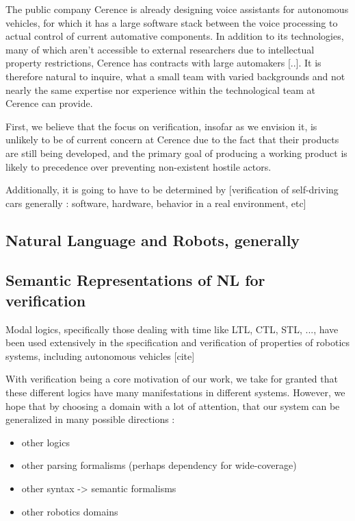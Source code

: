 \documentclass[a4paper, 11pt]{article}
\begin{document}
The public company Cerence \cite{} is already designing voice assistants for autonomous
vehicles, for which it has a large software stack between the voice processing
to actual control of current automative components. In addition to its 
technologies, many of which aren't accessible to external researchers due to
intellectual property restrictions, Cerence has contracts with large automakers
[..]. It is therefore natural to inquire, what a small team with varied
backgrounds and not nearly the same expertise nor experience within the
technological team at Cerence can provide.

First, we believe that the focus on verification, insofar as we envision it, is
unlikely to be of current concern at Cerence due to the fact that their products
are still being developed, and the primary goal of producing a working product
is likely to precedence over preventing non-existent hostile actors.

Additionally, it is going to have to be determined by 
[verification of self-driving cars generally : software, hardware, behavior in
a real environment, etc]


\subsection{Natural Language and Robots, generally}

\subsection{Semantic Representations of NL for verification}

Modal logics, specifically those dealing with time like LTL, CTL, STL, ..., have
been used extensively in the specification and verification of properties of
robotics systems, including autonomous vehicles [cite]

With verification being a core motivation of our work, we take for granted that
these different logics have many manifestations in different systems. However,
we hope that by choosing a domain with a lot of attention, that our system can
be generalized in many possible directions :

\begin{itemize}
\item other logics
\item other parsing formalisms (perhaps dependency for wide-coverage)
\item other syntax -> semantic formalisms
\item other robotics domains
\end{itemize}
\end{document}
